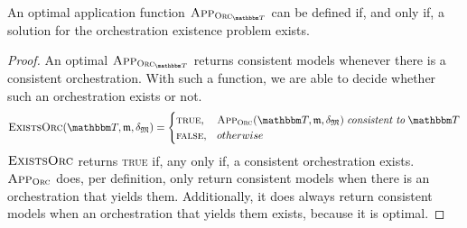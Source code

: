 \begin{theorem}
    \label{theorem:optimal_application_function_orchestration_problem}
    An optimal application function $\appfunction{\orcfunction{\transformationset{T}}}$ can be defined if, and only if, a solution for the orchestration existence problem exists.
\end{theorem}
\begin{proof}
    An optimal $\appfunction{\orcfunction{\transformationset{T}}}$ returns consistent models whenever there is a consistent orchestration.
    With such a function, we are able to decide whether such an orchestration exists or not.
    \begin{align*}
        \function{ExistsOrc}(\transformationset{T},\modeltuple{m},\changetuple{\metamodeltuple{M}}) =
            \begin{cases}
                \textsc{true}, & \appfunction{\orcfunction{}}(\transformationset{T}, \modeltuple{m},\changetuple{\metamodeltuple{M}}) \consistenttomath \transformationset{T} \\
                \textsc{false}, & otherwise
            \end{cases}
    \end{align*}
    $\textsc{ExistsOrc}$ returns \textsc{true} if, any only if, a consistent orchestration exists.
    $\textsc{App}_{\textsc{Orc}_{}}$ does, per definition, only return consistent models when there is an orchestration that yields them.
    Additionally, it does always return consistent models when an orchestration that yields them exists, because it is optimal.
\end{proof}

